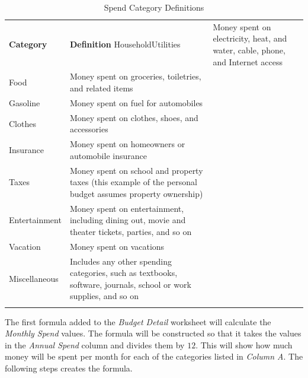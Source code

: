 \begin{table}[H]
	{\small
		\begin{longtable}{L{0.85in}L{3.40in}} %
			\textbf{Category} & \textbf{Definition} \endhead
			\hline
			Household\newline Utilities & Money spent on electricity, heat, and water, cable, phone, and Internet access\\
			Food & Money spent on groceries, toiletries, and related items\\
			Gasoline & Money spent on fuel for automobiles\\
			Clothes & Money spent on clothes, shoes, and accessories\\
			Insurance & Money spent on homeowners or automobile insurance\\
			Taxes & Money spent on school and property taxes (this example of the personal budget assumes property ownership)\\
			Entertainment & Money spent on entertainment, including dining out, movie and theater tickets, parties, and so on\\
			Vacation & Money spent on vacations\\
			Miscellaneous & Includes any other spending categories, such as textbooks, software, journals, school or work supplies, and so on\\
			\caption{Spend Category Definitions}
			\label{02:tab01}
		\end{longtable}
	} %
\end{table}

The first formula added to the \textit{Budget Detail} worksheet will calculate the \textit{Monthly Spend} values. The formula will be constructed so that it takes the values in the \textit{Annual Spend} column and divides them by $ 12 $. This will show how much money will be spent per month for each of the categories listed in \textit{Column A}. The following steps creates the formula.

